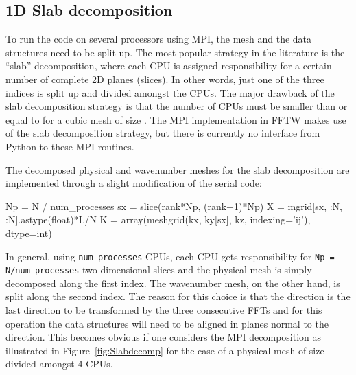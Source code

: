 \documentclass[final,3p,times,twocolumn]{elsarticle}
\newcommand{\inpyth}{\lstinline[style=inlinestyle]}
\begin{document}
\subsection{1D Slab decomposition}
\label{slab1D}

To run the code on several processors using MPI, the mesh and the data 
structures need to be split up. The most popular strategy in the literature is 
the ``slab'' decomposition, where each CPU is assigned responsibility for a 
certain number of complete 2D planes (slices). In other words, just one of the 
three indices  is split up and divided amongst the CPUs. The major 
drawback of the slab decomposition strategy is that the number of CPUs must be 
smaller than or equal to  for a cubic mesh of size . The MPI 
implementation in FFTW makes use of the slab decomposition strategy, but there 
is currently no interface from Python to these MPI routines.

The decomposed physical and wavenumber meshes for the slab decomposition are implemented through a slight modification of the serial code:

\begin{python}
Np = N / num_processes
sx = slice(rank*Np, (rank+1)*Np)
X = mgrid[sx, :N, :N].astype(float)*L/N
K = array(meshgrid(kx, ky[sx], kz,
          indexing='ij'), dtype=int)
\end{python}
In general, using \inpyth{num_processes} CPUs, each CPU gets responsibility for \inpyth{Np = N/num_processes} two-dimensional slices and the physical mesh is simply decomposed along the first index. The wavenumber mesh, on the other hand, is split along the second index. The reason for this choice is that the  direction is the last direction to be transformed by the three consecutive FFTs and for this operation the data structures will need to be aligned in planes normal to the  direction. This becomes obvious if one considers the MPI decomposition as illustrated in Figure~\ref{fig:Slabdecomp} for the case of a physical mesh of size  divided amongst 4 CPUs.
\end{document}
